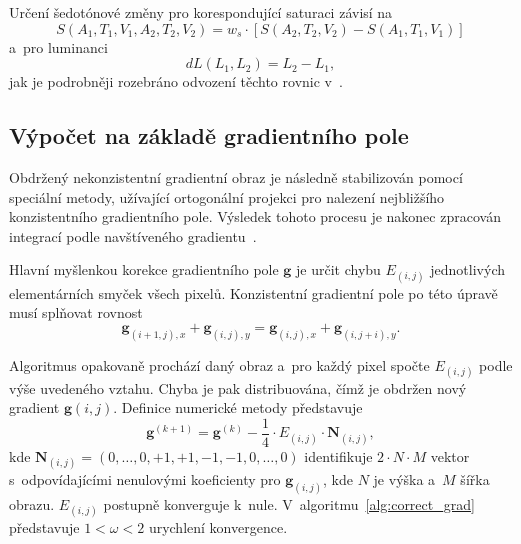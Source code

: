 \documentclass[11pt,a4paper,oneside]{article}
\begin{document}
	Určení šedotónové změny pro korespondující saturaci závisí na
	\begin{equation}
		S(A_1, T_1, V_1, A_2, T_2, V_2) = w_s \cdot \left[S(A_2, T_2, V_2) - S(A_1, T_1, V_1)\right]
		\label{eq:sat}
	\end{equation}
	a~pro luminanci
	\begin{equation}
		dL(L_1, L_2) = L_2 - L_1,
		\label{eq:lum}
	\end{equation}
	jak je podrobněji rozebráno odvození těchto rovnic v~\cite{cadik07color_to_gray}.

	\subsection{Výpočet na základě gradientního pole}
	Obdržený nekonzistentní gradientní obraz je následně stabilizován pomocí speciální metody, užívající
	ortogonální projekci pro nalezení nejbližšího konzistentního gradientního pole. Výsledek
	tohoto procesu je nakonec zpracován integrací podle navštíveného gradientu~\cite{cadik07color_to_gray}.

	Hlavní myšlenkou korekce gradientního pole $\mathbf{g}$ je určit chybu $E_{(i, j)}$
	jednotlivých elementárních smyček všech pixelů. Konzistentní gradientní pole po
	této úpravě musí splňovat rovnost
	$$
		\mathbf{g}_{(i + 1, j), x} + \mathbf{g}_{(i, j), y} =
		\mathbf{g}_{(i, j), x} + \mathbf{g}_{(i, j + i), y}.
	$$

	Algoritmus opakovaně prochází daný obraz a~pro každý pixel spočte $E_{(i, j)}$ podle výše uvedeného
	vztahu. Chyba je pak distribuována, čímž je obdržen nový gradient $\mathbf{g}(i, j)$. Definice
	numerické metody představuje
	\begin{equation}
		\mathbf{g}^{(k + 1)} = \mathbf{g}^{(k)} - \frac{1}{4} \cdot E_{(i, j)} \cdot \mathbf{N}_{(i, j)},
	\end{equation}
	kde $\mathbf{N}_{(i, j)} = (0, \dots, 0, +1, +1, -1, -1, 0, \dots, 0)$ identifikuje $2 \cdot
	N \cdot M$ vektor s~odpovídajícími nenulovými koeficienty pro $\mathbf{g}_{(i,j)}$, kde $N$
	je výška a~$M$ šířka obrazu. $E_{(i, j)}$ postupně konverguje k~nule. V~algoritmu~\ref{alg:correct_grad}
	představuje $1 < \omega < 2$ urychlení konvergence.
\end{document}
